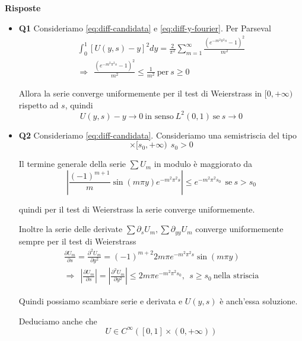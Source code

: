 \documentclass[10pt,a4paper,twoside,openright]{book}
\begin{document}
\textbf{Risposte}
\begin{itemize}
\item \textbf{Q1} Consideriamo \eqref{eq:diff-candidata} e \eqref{eq:diff-y-fourier}. Per Parseval\begin{gather*}
\int ^{1}_{0}[ U(y,s) -y]^{2} dy=\frac{2}{\pi ^{2}}\sum\limits ^{\infty }_{m=1}\frac{\left( e^{-m^{2} \pi ^{2} s} -1\right)^{2}}{m^{2}}\\
\Rightarrow \ \ \frac{\left( e^{-m^{2} \pi ^{2} s} -1\right)^{2}}{m^{2}} \leqslant \frac{1}{m^{2}} \ \text{per} \ s\geqslant 0
\end{gather*}

Allora la serie converge uniformemente per il test di Weierstrass in $[ 0,+\infty)$ rispetto ad $s$, quindi\begin{equation*}
U(y,s) -y\rightarrow 0\ \text{in senso} \ L^{2}(0,1) \ \text{se} \ s\rightarrow 0
\end{equation*}
\item \textbf{Q2} Consideriamo \eqref{eq:diff-candidata}. Consideriamo una semistriscia del tipo\begin{equation*}
[ 0,1] \times [ s_{0},+\infty) \ \ s_{0}  >0
\end{equation*}

Il termine generale della serie $\sum U_{m}$ in modulo è maggiorato da\begin{equation*}
\left| \frac{(-1)^{m+1}}{m}\sin(m\pi y) e^{-m^{2} \pi ^{2} s}\right| \leqslant e^{-m^{2} \pi ^{2} s_{0}} \ \ \text{se} \ s >s_{0}
\end{equation*}

quindi per il test di Weierstrass la serie converge uniformemente.

Inoltre la serie delle derivate $\sum \partial _{s} U_{m},\sum \partial _{yy} U_{m}$ converge uniformemente sempre per il test di Weierstrass\begin{gather*}
\frac{\partial U_{m}}{\partial s} =\frac{\partial ^{2} U_{m}}{\partial y^{2}} =(-1)^{m+2} 2m\pi e^{-m^{2} \pi ^{2} s}\sin(m\pi y)\\
\Rightarrow \ \ \left| \frac{\partial U_{m}}{\partial s}\right| =\left| \frac{\partial ^{2} U_{m}}{\partial y^{2}}\right| \leqslant 2m \pi e^{-m^{2} \pi ^{2} s_{0}},\ \ s\geqslant s_{0} \ \text{nella striscia}
\end{gather*}

Quindi possiamo scambiare serie e derivata e $U(y,s)$ è anch'essa soluzione.

Deduciamo anche che\begin{equation*}
U\in C^{\infty }([ 0,1] \times (0,+\infty))
\end{equation*}


\end{itemize}
\end{document}
